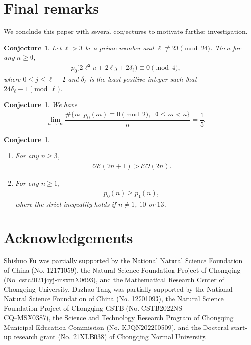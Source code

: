 \documentclass[12pt,reqno]{amsart}
\numberwithin{equation}{section}
\theoremstyle{plain}
\newtheorem{conjecture}[theorem]{Conjecture}
\theoremstyle{definition}
\begin{document}
\section{Final remarks}


We conclude this paper with several conjectures to motivate further investigation.

\begin{conjecture}
Let $\ell>3$ be a prime number and $\ell\not\equiv23\pmod{24}$. Then for any $n\geq0$,
\begin{align*}
p_0\big(2\ell^2n+2\ell j+2\delta_\ell\big)\equiv0\pmod{4},
\end{align*}
where $0\leq j\leq\ell-2$ and $\delta_\ell$ is the least positive integer such that
$24\delta_\ell\equiv1\pmod{\ell}$.
\end{conjecture}

\begin{conjecture}
We have
\begin{align*}
\lim_{n\rightarrow\infty}\dfrac{\#\{m|\:p_0(m)\equiv0\pmod{2},\;\;0\leq m<n\}}{n}=\dfrac{1}{5}.
\end{align*}
\end{conjecture}

\begin{conjecture}
\leavevmode
\begin{enumerate}[{\rm (i)}]
\item For any $n\geq3$,
\begin{align*}
\overline{\mathcal{OE}}(2n+1)>\overline{\mathcal{EO}}(2n).
\end{align*}
\item For any $n\geq1$,
\begin{align*}
p_0(n)\ge p_1(n),
\end{align*}
where the strict inequality holds if $n\neq1$, $10$ or $13$.
\end{enumerate}
\end{conjecture}



\section*{Acknowledgements}


Shishuo Fu was partially supported by the National Natural Science Foundation of China (No. 12171059), the Natural
Science Foundation Project of Chongqing (No. cstc2021jcyj-msxmX0693), and the Mathematical Research Center of Chongqing 
University. Dazhao Tang was partially supported by the National Natural Science Foundation of China (No. 12201093), the 
Natural Science Foundation Project of Chongqing CSTB (No. CSTB2022NS\\CQ--MSX0387), the Science and Technology Research 
Program of Chongqing Municipal Education Commission (No. KJQN202200509), and the Doctoral start-up research grant 
(No. 21XLB038) of Chongqing Normal University.
\end{document}
